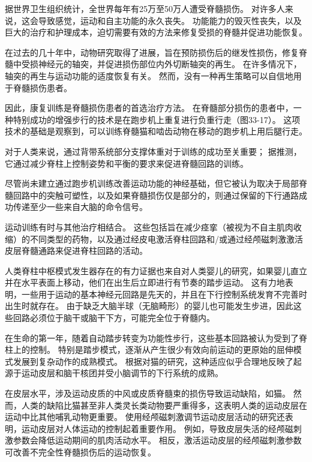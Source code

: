 \begin{proposition}[康复训练可改善人类脊髓损伤后的行走] \label{box:33_4}
	
	\quad \quad 据世界卫生组织统计，全世界每年有25万至50万人遭受脊髓损伤。
	对许多人来说，这会导致感觉，运动和自主功能的永久丧失。
	功能能力的毁灭性丧失，以及巨大的治疗和护理成本，迫切需要有效的方法来修复受损的脊髓并促进功能恢复。
	
	\quad \quad 在过去的几十年中，动物研究取得了进展，旨在预防损伤后的继发性损伤，修复脊髓中受损神经元的轴突，并促进损伤部位内外切断轴突的再生。
	在许多情况下，轴突的再生与运动功能的适度恢复有关。
	然而，没有一种再生策略可以自信地用于脊髓损伤患者。
	
	\quad \quad 因此，康复训练是脊髓损伤患者的首选治疗方法。
	在脊髓部分损伤的患者中，一种特别成功的增强步行的技术是在跑步机上重复进行负重行走（图33-17）。
	这项技术的基础是观察到，可以训练脊髓猫和啮齿动物在移动的跑步机上用后腿行走。
	
	\quad \quad 对于人类来说，通过背带系统部分支撑体重对于训练的成功至关重要；
	据推测，它通过减少脊柱上控制姿势和平衡的要求来促进脊髓回路的训练。
	
	\quad \quad 尽管尚未建立通过跑步机训练改善运动功能的神经基础，但它被认为取决于局部脊髓回路中的突触可塑性，以及如果脊髓损伤仅是部分的，则通过保留的下行通路成功传递至少一些来自大脑的命令信号。
	
	\quad \quad 运动训练有时与其他治疗相结合。
	这些包括旨在减少痉挛（被视为不自主肌肉收缩）的不同类型的药物，以及通过经皮电激活脊柱回路和/或通过经颅磁刺激激活皮层脊髓通路来促进脊柱回路的活动。
	
\end{proposition}


人类脊柱中枢模式发生器存在的有力证据也来自对人类婴儿的研究，如果婴儿直立并在水平表面上移动，他们在出生后立即进行有节奏的踏步运动。
这有力地表明，一些用于运动的基本神经元回路是先天的，并且在下行控制系统发育不完善时出生时就存在。
由于缺乏大脑半球（无脑畸形）的婴儿也可能发生步进，因此这些回路必须位于脑干或脑干下方，可能完全位于脊髓内。


在生命的第一年，随着自动踏步转变为功能性步行，这些基本回路被认为受到了脊柱上的控制。
特别是踏步模式，逐渐从产生很少有效向前运动的更原始的屈伸模式发展到复杂动作的成熟模式。
根据对猫的研究，这种适应似乎合理地反映了起源于运动皮层和脑干核团并受小脑调节的下行系统的成熟。


在皮层水平，涉及运动皮质的中风或皮质脊髓束的损伤导致运动缺陷，如猫。
然而，人类的缺陷比猫甚至非人类灵长类动物要严重得多，这表明人类的运动皮层在运动中比其他哺乳动物更重要。
使用经颅磁刺激调节运动皮层活动的研究还表明，运动皮层对人体运动的控制起着重要作用。
例如，导致皮层失活的经颅磁刺激参数会降低运动期间的肌肉活动水平。
相反，激活运动皮层的经颅磁刺激参数可改善不完全性脊髓损伤后的运动恢复。


